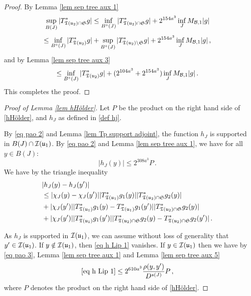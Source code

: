 {    \begin{proof}
        By Lemma \ref{lem sep tree aux 1}
        $$
            \sup_{B(J)} |T^*_{\mathfrak T(\mathfrak u_2) \cap \mathfrak{S}} g| \le \inf_{B^\circ{}(J)} |T_{\mathfrak T(\mathfrak u_2) \cap \mathfrak{S}}^* g| +  2^{154a^3} \inf_{J} M_{\mathcal{B}, 1} |g|
        $$
        $$
            \le \inf_{B^\circ{}(J)} |T_{\mathfrak T(\mathfrak u_2)}^* g| + \sup_{B^\circ{}(J)} |T_{\mathfrak T(\mathfrak u_2) \setminus \mathfrak{S}}^* g| +  2^{154a^3} \inf_{J} M_{\mathcal{B}, 1} |g|\,,
        $$
        and by Lemma \ref{lem sep tree aux 3}
        $$
            \le \inf_{B^\circ{}(J)} |T_{\mathfrak T(\mathfrak u_2)}^* g| + (2^{104a^3} + 2^{154a^3}) \inf_{J} M_{\mathcal{B}, 1} |g|\,.
        $$
        This completes the proof.
    \end{proof}



    \begin{proof}[Proof of Lemma \ref{lem hHölder}]
        Let $P$ be the product on the right hand side of \eqref{hHölder}, and $h_J$ as defined in \eqref{def hj}.

        By \eqref{eq pao 2} and Lemma \ref{lem Tp support adjoint}, the function $h_J$ is supported in $B(J) \cap \mathcal{I}(\mathfrak u_1)$.
        By \eqref{eq pao 2} and Lemma \ref{lem sep tree aux 1}, we have for all $y \in B(J)$:
        $$
            |h_J(y)| \le 2^{308a^3} P\,.
        $$
        We have by the triangle inequality
        \begin{align}
            &|h_J(y) - h_J(y')|\nonumber\\
            \label{eq h Lip 1}
            &\le |\chi_J(y) - \chi_J(y')| |T_{\mathfrak T(\mathfrak u_1)}^* g_1(y)| |T_{\mathfrak T(\mathfrak u_2) \cap \mathfrak{S}}^* g_2(y)|\\
            \label{eq h Lip 2}
            & + |\chi_J(y')| |T_{\mathfrak T(\mathfrak u_1)}^* g_1(y) - T_{\mathfrak T(\mathfrak u_1)}^* g_1(y')| |T_{\mathfrak T(\mathfrak u_2) \cap \mathfrak{S}}^* g_2(y)|\\
            \label{eq h Lip 3}
            & + |\chi_J(y')| |T_{\mathfrak T(\mathfrak u_1)}^* g_1(y')| |T_{\mathfrak T(\mathfrak u_2) \cap \mathfrak{S}}^* g_2(y) - T_{\mathfrak T(\mathfrak u_2) \cap \mathfrak{S}}^* g_2(y')|\,.
        \end{align}

        As $h_J$ is supported in $\mathcal{I}(\mathfrak u_1)$, we can assume without loss of generality that $y' \in \mathcal{I}(\mathfrak u_1)$.
        If $y \notin \mathcal{I}(\mathfrak u_1)$, then \eqref{eq h Lip 1} vanishes. If $y \in \mathcal{I}(\mathfrak u_1)$ then we have by \eqref{eq pao 3}, Lemma \ref{lem sep tree aux 1} and Lemma \ref{lem sep tree aux 5}
        $$
            \eqref{eq h Lip 1} \le 2^{610a^3} \frac{\rho(y,y')}{D^{s(J)}} P\,,
        $$
        where $P$ denotes the product on the right hand side of \eqref{hHölder}.


\end{proof}}
